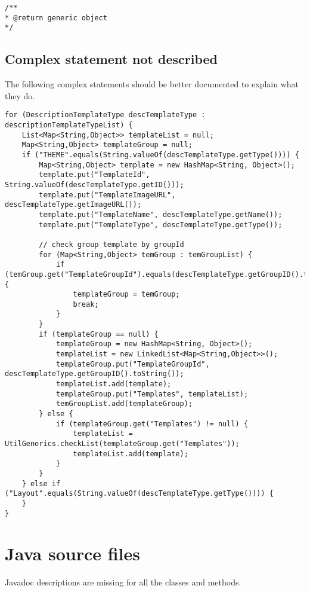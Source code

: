 \begin{lstlisting}[firstnumber=205, caption={tags not described}]
/**
* @return generic object
*/
\end{lstlisting}

\subsection{Complex statement not described}
The following complex statements should be better documented to explain what they do.

\begin{lstlisting}[firstnumber=233, caption={complex for not documented}]
for (DescriptionTemplateType descTemplateType : descriptionTemplateTypeList) {
    List<Map<String,Object>> templateList = null;
    Map<String,Object> templateGroup = null;
    if ("THEME".equals(String.valueOf(descTemplateType.getType()))) {
        Map<String,Object> template = new HashMap<String, Object>();
        template.put("TemplateId", String.valueOf(descTemplateType.getID()));
        template.put("TemplateImageURL", descTemplateType.getImageURL());
        template.put("TemplateName", descTemplateType.getName());
        template.put("TemplateType", descTemplateType.getType());

        // check group template by groupId
        for (Map<String,Object> temGroup : temGroupList) {
            if (temGroup.get("TemplateGroupId").equals(descTemplateType.getGroupID().toString())) {
                templateGroup = temGroup;
                break;
            }
        }
        if (templateGroup == null) {
            templateGroup = new HashMap<String, Object>();
            templateList = new LinkedList<Map<String,Object>>();
            templateGroup.put("TemplateGroupId", descTemplateType.getGroupID().toString());
            templateList.add(template);
            templateGroup.put("Templates", templateList);
            temGroupList.add(templateGroup);
        } else {
            if (templateGroup.get("Templates") != null) {
                templateList = UtilGenerics.checkList(templateGroup.get("Templates"));
                templateList.add(template);
            }
        }
    } else if ("Layout".equals(String.valueOf(descTemplateType.getType()))) {
    }
}
\end{lstlisting}




\section{Java source files}
Javadoc descriptions are missing for all the classes and methods.

